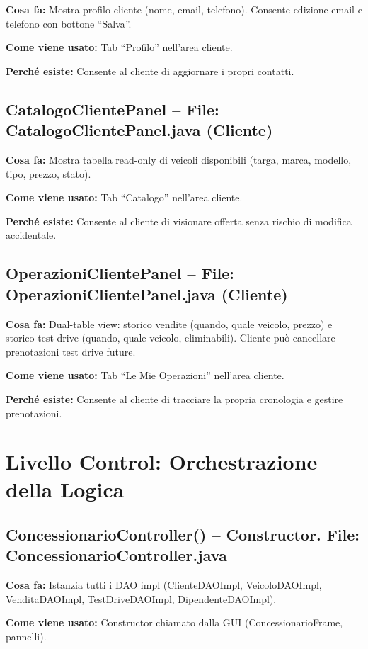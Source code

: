 \documentclass[12pt,a4paper]{article}
\begin{document}
\textbf{Cosa fa:}
Mostra profilo cliente (nome, email, telefono).
Consente edizione email e telefono con bottone ``Salva''.

\textbf{Come viene usato:}
Tab ``Profilo'' nell'area cliente.

\textbf{Perché esiste:}
Consente al cliente di aggiornare i propri contatti.

\subsection{CatalogoClientePanel -- File: CatalogoClientePanel.java (Cliente)}

\textbf{Cosa fa:}
Mostra tabella read-only di veicoli disponibili (targa, marca, modello, tipo, prezzo, stato).

\textbf{Come viene usato:}
Tab ``Catalogo'' nell'area cliente.

\textbf{Perché esiste:}
Consente al cliente di visionare offerta senza rischio di modifica accidentale.

\subsection{OperazioniClientePanel -- File: OperazioniClientePanel.java (Cliente)}

\textbf{Cosa fa:}
Dual-table view: storico vendite (quando, quale veicolo, prezzo) e storico test drive (quando, quale veicolo, eliminabili).
Cliente può cancellare prenotazioni test drive future.

\textbf{Come viene usato:}
Tab ``Le Mie Operazioni'' nell'area cliente.

\textbf{Perché esiste:}
Consente al cliente di tracciare la propria cronologia e gestire prenotazioni.

\section{Livello Control: Orchestrazione della Logica}

\subsection{ConcessionarioController() -- Constructor. File: ConcessionarioController.java}

\textbf{Cosa fa:}
Istanzia tutti i DAO impl (ClienteDAOImpl, VeicoloDAOImpl, VenditaDAOImpl, TestDriveDAOImpl, DipendenteDAOImpl).

\textbf{Come viene usato:}
Constructor chiamato dalla GUI (ConcessionarioFrame, pannelli).
\end{document}

